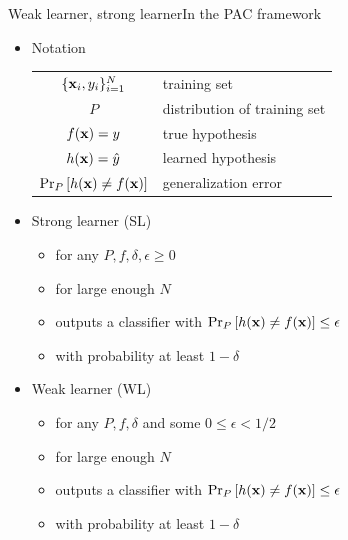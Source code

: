 \documentclass[handout]{beamer}
\begin{document}
\begin{frame}{Weak learner, strong learner}{In the PAC framework}
\begin{itemize}[<+>]
\item Notation\\
\begin{tabular}{cl}
	$ \{\mathrm{\mathbf{x}}_i, y_i\}_{i=1}^N $ & training set \\
	$ P $ & distribution of training set \\
	$ f(\mathrm{\mathbf{x}}) = y $ & true hypothesis \\
	$ h(\mathrm{\mathbf{x}}) = \hat y $ & learned hypothesis \\
	$ \Pr_P\left[h(\mathrm{\mathbf{x}})\ne f(\mathrm{\mathbf{x}})\right] $ & generalization error
\end{tabular}

\item Strong learner (SL)
\begin{itemize}[<.->]
	\item for any $ P, f, \delta, \epsilon\ge 0$
	\item for large enough $ N $
	\item outputs a classifier with $ \Pr_{P}\left[h(\mathrm{\mathbf{x}}) \ne f(\mathrm{\mathbf{x}})\right] \le \epsilon $
	\item with probability at least $ 1-\delta $
\end{itemize}

\item Weak learner (WL)
\begin{itemize}[<.->]
	\item for any $ P, f, \delta $ and \alert{some} $ 0\le \epsilon < 1/2 $
	\item for large enough $ N $
	\item outputs a classifier with $ \Pr_{P}\left[h(\mathrm{\mathbf{x}}) \ne f(\mathrm{\mathbf{x}})\right] \le \epsilon $
	\item with probability at least $ 1-\delta $
\end{itemize}
\end{itemize}
\end{frame}
\end{document}
